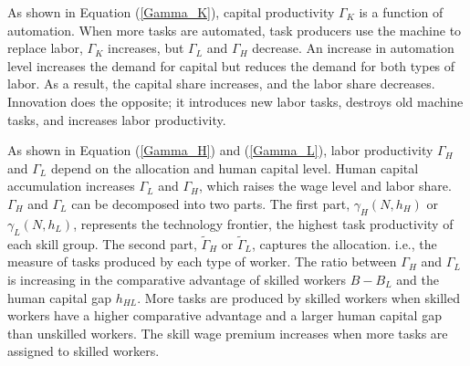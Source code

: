 \documentclass[12pt]{article}
\begin{document}
As shown in Equation (\ref{Gamma_K}), capital productivity $\Gamma_K$ is a function of automation. When more tasks are automated, task producers use the machine to replace labor, $\Gamma_K$ increases, but $\Gamma_L$ and $\Gamma_H$ decrease. An increase in automation level increases the demand for capital but reduces the demand for both types of labor. As a result, the capital share increases, and the labor share decreases. Innovation does the opposite; it introduces new labor tasks, destroys old machine tasks, and increases labor productivity. 

As shown in Equation (\ref{Gamma_H}) and (\ref{Gamma_L}), labor productivity $\Gamma_H$ and $\Gamma_L$ depend on the allocation and human capital level. Human capital accumulation increases $\Gamma_L$ and $\Gamma_H$, which raises the wage level and labor share. $\Gamma_H$ and $\Gamma_L$ can be decomposed into two parts. The first part, $\gamma_H(N,h_H)$ or $\gamma_L(N,h_L)$, represents the technology frontier, the highest task productivity of each skill group. The second part, $\tilde{\Gamma}_H$ or $\tilde{\Gamma}_L$, captures the allocation. i.e., the measure of tasks produced by each type of worker. The ratio between $\Gamma_H$ and $\Gamma_L$ is increasing in the comparative advantage of skilled workers $B-B_L$ and the human capital gap $h_{HL}$. More tasks are produced by skilled workers when skilled workers have a higher comparative advantage and a larger human capital gap than unskilled workers. The skill wage premium increases when more tasks are assigned to skilled workers. 
\end{document}
